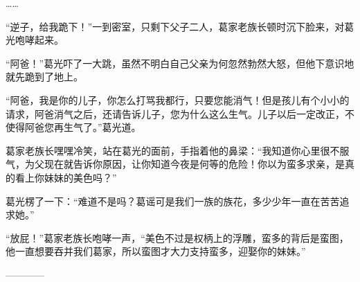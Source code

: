 \begin{this_body}
……

“逆子，给我跪下！”一到密室，只剩下父子二人，葛家老族长顿时沉下脸来，对葛光咆哮起来。

“阿爸！”葛光吓了一大跳，虽然不明白自己父亲为何忽然勃然大怒，但他下意识地就先跪到了地上。

“阿爸，我是你的儿子，你怎么打骂我都行，只要您能消气！但是孩儿有个小小的请求，阿爸消气之后，还请告诉儿子，您为什么这么生气。儿子以后一定改正，不使得阿爸您再生气了。”葛光道。

葛家老族长嘿嘿冷笑，站在葛光的面前，手指着他的鼻梁：“我知道你心里很不服气，为父现在就告诉你原因，让你知道今夜是何等的危险！你以为蛮多求亲，是真的看上你妹妹的美色吗？”

葛光楞了一下：“难道不是吗？葛谣可是我们一族的族花，多少少年一直在苦苦追求她。”

“放屁！”葛家老族长咆哮一声，“美色不过是权柄上的浮雕，蛮多的背后是蛮图，他一直想要吞并我们葛家，所以蛮图才大力支持蛮多，迎娶你的妹妹。”

------------

\end{this_body}

